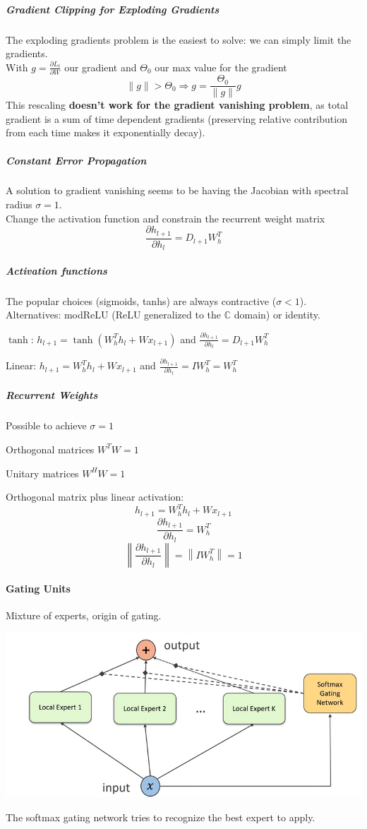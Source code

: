 \documentclass[10pt]{report}
\begin{document}
\subparagraph{Gradient Clipping for Exploding Gradients} The exploding gradients problem is the easiest to solve: we can simply limit the gradients.\\
With $g=\frac{\partial L_t}{\partial W}$ our gradient and $\Theta_0$ our max value for the gradient
$$\|g\|>\Theta_0\Rightarrow g=\frac{\Theta_0}{\|g\|}g$$
This rescaling \textbf{doesn't work for the gradient vanishing problem}, as total gradient is a sum of time dependent gradients (preserving relative contribution from each time makes it exponentially decay).
\subparagraph{Constant Error Propagation} A solution to gradient vanishing seems to be having the Jacobian with spectral radius $\sigma = 1$.\\
Change the activation function and constrain the recurrent weight matrix
$$\frac{\partial h_{l+1}}{\partial h_l}=D_{l+1}W_h^T$$
\subparagraph{Activation functions} The popular choices (sigmoids, tanhs) are always contractive ($\sigma < 1$). Alternatives: modReLU (ReLU generalized to the $\mathbb{C}$ domain) or identity.
\begin{list}{}{}
	\item $\tanh$: $h_{l+1}=\tanh(W_h^Th_l+Wx_{l+1})$ and $\frac{\displaystyle \partial h_{l+1}}{\displaystyle \partial h_l} = D_{l+1}W_h^T$
	\item Linear: $h_{l+1}=W_h^Th_l+Wx_{l+1}$ and $\frac{\displaystyle \partial h_{l+1}}{\displaystyle \partial h_l} = IW_h^T = W_h^T$
\end{list}
\subparagraph{Recurrent Weights} Possible to achieve $\sigma = 1$
\begin{list}{}{}
	\item Orthogonal matrices $W^TW = 1$
	\item Unitary matrices $W^H W = 1$
\end{list}
Orthogonal matrix plus linear activation:
$$h_{l+1}= W_h^Th_l+Wx_{l+1}$$
$$\frac{\partial h_{l+1}}{\partial h_l} = W_h^T$$
$$\left\|\frac{\partial h_{l+1}}{\partial h_l}\right\|=\left\|IW_h^T\right\|=1$$
\paragraph{Gating Units} Mixture of experts, origin of gating.
\begin{center}
	\includegraphics[scale=0.5]{93.png}
\end{center}
The softmax gating network tries to recognize the best expert to apply.
\end{document}
